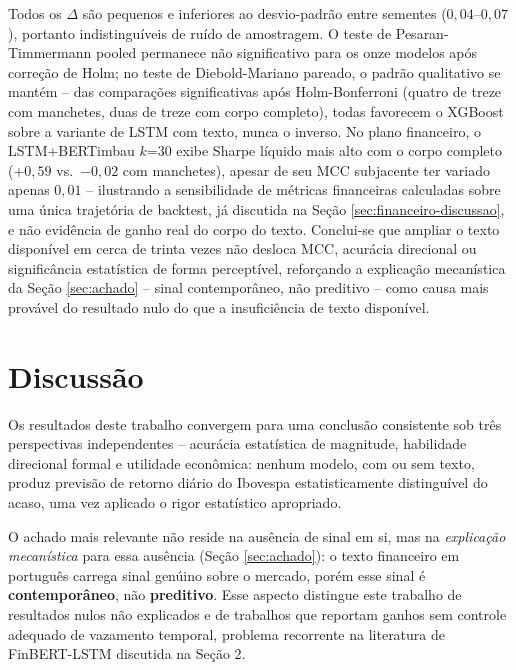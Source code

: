 \documentclass[conference]{IEEEtran}
\begin{document}
Todos os $\Delta$ s\~ao pequenos e inferiores ao desvio-padr\~ao entre sementes ($0{,}04$--$0{,}07$), portanto indistingu\'iveis de ru\'ido de amostragem. O teste de Pesaran-Timmermann pooled permanece n\~ao significativo para os onze modelos ap\'os corre\c{c}\~ao de Holm; no teste de Diebold-Mariano pareado, o padr\~ao qualitativo se mant\'em -- das compara\c{c}\~oes significativas ap\'os Holm-Bonferroni (quatro de treze com manchetes, duas de treze com corpo completo), todas favorecem o XGBoost sobre a variante de LSTM com texto, nunca o inverso. No plano financeiro, o LSTM+BERTimbau $k$=30 exibe Sharpe l\'iquido mais alto com o corpo completo ($+0{,}59$ vs.\ $-0{,}02$ com manchetes), apesar de seu MCC subjacente ter variado apenas $0{,}01$ -- ilustrando a sensibilidade de m\'etricas financeiras calculadas sobre uma \'unica trajet\'oria de backtest, j\'a discutida na Se\c{c}\~ao \ref{sec:financeiro-discussao}, e n\~ao evid\^encia de ganho real do corpo do texto. Conclui-se que ampliar o texto dispon\'ivel em cerca de trinta vezes n\~ao desloca MCC, acur\'acia direcional ou signific\^ancia estat\'istica de forma percept\'ivel, reforçando a explica\c{c}\~ao mecan\'istica da Se\c{c}\~ao \ref{sec:achado} -- sinal contempor\^aneo, n\~ao preditivo -- como causa mais prov\'avel do resultado nulo do que a insufici\^encia de texto dispon\'ivel.

\section{Discuss\~ao}

Os resultados deste trabalho convergem para uma conclus\~ao consistente sob tr\^es perspectivas independentes -- acur\'acia estat\'istica de magnitude, habilidade direcional formal e utilidade econ\^omica: nenhum modelo, com ou sem texto, produz previs\~ao de retorno di\'ario do Ibovespa estatisticamente distingu\'ivel do acaso, uma vez aplicado o rigor estat\'istico apropriado.

O achado mais relevante n\~ao reside na aus\^encia de sinal em si, mas na \emph{explica\c{c}\~ao mecan\'istica} para essa aus\^encia (Se\c{c}\~ao \ref{sec:achado}): o texto financeiro em portugu\^es carrega sinal gen\'uino sobre o mercado, por\'em esse sinal \'e \textbf{contempor\^aneo}, n\~ao \textbf{preditivo}. Esse aspecto distingue este trabalho de resultados nulos n\~ao explicados e de trabalhos que reportam ganhos sem controle adequado de vazamento temporal, problema recorrente na literatura de FinBERT-LSTM discutida na Se\c{c}\~ao 2.
\end{document}
